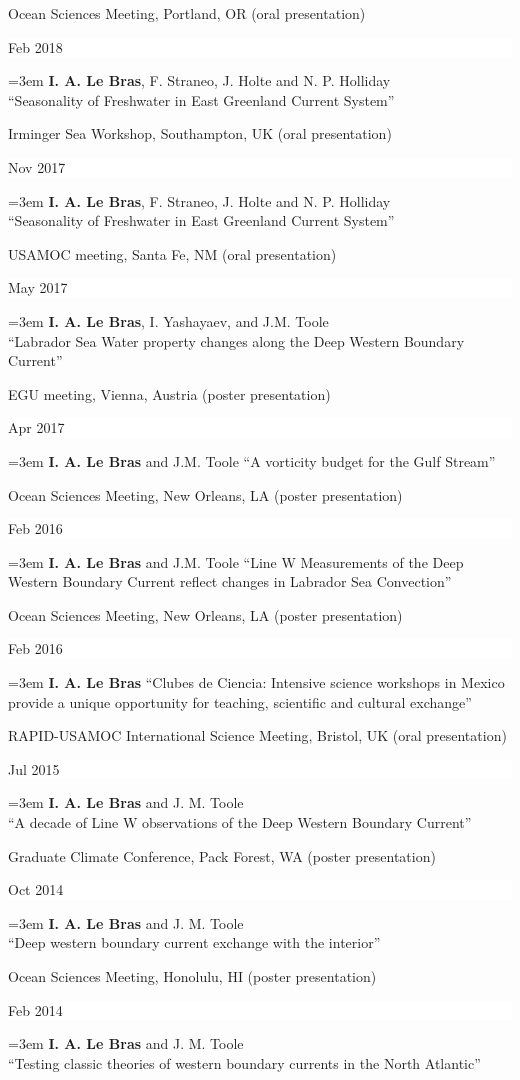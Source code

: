\documentclass[paper=letter,fontsize=11pt]{scrartcl} %
\newcommand{\sepspace}{\vspace*{3mm}}		%
\newcommand{\ConfEntry}[5]{
		\noindent #1 (#2) \hfill      %
		\colorbox{White}{%
			\parbox{6em}{%
			\hfill\color{Black}#3}} \par %
		\noindent \hangindent=3em\hangafter=0 #4 ``#5'' \sepspace}
\begin{document}
\ConfEntry{Ocean Sciences Meeting, Portland, OR}{oral presentation}{Feb 2018}{\textbf{I. A. Le Bras}, F. Straneo, J. Holte and N. P. Holliday\\}{Seasonality of Freshwater in East Greenland Current System}

\ConfEntry{Irminger Sea Workshop, Southampton, UK}{oral presentation}{Nov 2017}{\textbf{I. A. Le Bras}, F. Straneo, J. Holte and N. P. Holliday\\}{Seasonality of Freshwater in East Greenland Current System}

\ConfEntry{USAMOC meeting, Santa Fe, NM}{oral presentation}{May 2017}{\textbf{I. A. Le Bras}, I. Yashayaev, and J.M. Toole\\}{Labrador Sea Water property changes along the Deep Western Boundary Current}

\ConfEntry{EGU meeting, Vienna, Austria}{poster presentation}{Apr 2017}{\textbf{I. A. Le Bras} and J.M. Toole}{A vorticity budget for the Gulf Stream}

\ConfEntry{Ocean Sciences Meeting, New Orleans, LA}{poster presentation}{Feb 2016}{\textbf{I. A. Le Bras} and J.M. Toole}{Line W Measurements of the Deep Western Boundary Current reflect changes in Labrador Sea Convection}

\ConfEntry{Ocean Sciences Meeting, New Orleans, LA}{poster presentation}{Feb 2016}{\textbf{I. A. Le Bras}}{Clubes de Ciencia: Intensive science workshops in Mexico provide a unique opportunity for teaching, scientific and cultural exchange}

\ConfEntry{RAPID-USAMOC International Science Meeting, Bristol, UK}{oral presentation}{Jul 2015}{\textbf{I. A. Le Bras} and J. M. Toole\\}{A decade of Line W observations of the Deep Western Boundary Current}

\ConfEntry{Graduate Climate Conference, Pack Forest, WA}{poster presentation}{Oct 2014}{\textbf{I. A. Le Bras} and J. M. Toole\\}{Deep western boundary current exchange with the interior}

\ConfEntry{Ocean Sciences Meeting, Honolulu, HI}{poster presentation}{Feb 2014}{\textbf{I. A. Le Bras} and J. M. Toole\\}{Testing classic theories of western boundary currents in the North Atlantic}
\end{document}
